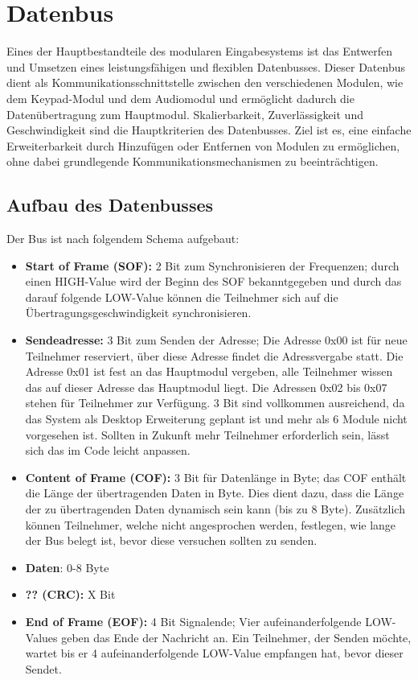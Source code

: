 \section{Datenbus}
Eines der Hauptbestandteile des modularen Eingabesystems ist das Entwerfen und Umsetzen eines leistungsfähigen und flexiblen Datenbusses. Dieser Datenbus dient als Kommunikationsschnittstelle zwischen den verschiedenen Modulen, wie dem Keypad-Modul und dem Audiomodul und ermöglicht dadurch die Datenübertragung zum Hauptmodul. Skalierbarkeit, Zuverlässigkeit und Geschwindigkeit sind die Hauptkriterien des Datenbusses. Ziel ist es, eine einfache Erweiterbarkeit durch Hinzufügen oder Entfernen von Modulen zu ermöglichen, ohne dabei grundlegende Kommunikationsmechanismen zu beeinträchtigen.

\subsection{Aufbau des Datenbusses}
Der Bus ist nach folgendem Schema aufgebaut:
\begin{itemize}
	\item \textbf{Start of Frame (SOF):} 2 Bit zum Synchronisieren der Frequenzen; durch einen HIGH-Value wird der Beginn des SOF bekanntgegeben und durch das darauf folgende LOW-Value können die Teilnehmer sich auf die Übertragungsgeschwindigkeit synchronisieren.
	\item \textbf{Sendeadresse:} 3 Bit zum Senden der Adresse; Die Adresse 0x00 ist für neue Teilnehmer reserviert, über diese Adresse findet die Adressvergabe statt. Die Adresse 0x01 ist fest an das Hauptmodul vergeben, alle Teilnehmer wissen das auf dieser Adresse das Hauptmodul liegt. Die Adressen 0x02 bis 0x07 stehen für Teilnehmer zur Verfügung. 3 Bit sind vollkommen ausreichend, da das System als Desktop Erweiterung geplant ist und mehr als 6 Module nicht vorgesehen ist. Sollten in Zukunft mehr Teilnehmer erforderlich sein, lässt sich das im Code leicht anpassen.
	\item \textbf{Content of Frame (COF):} 3 Bit für Datenlänge in Byte; das COF enthält die Länge der übertragenden Daten in Byte. Dies dient dazu, dass die Länge der zu übertragenden Daten dynamisch sein kann (bis zu 8 Byte). Zusätzlich können Teilnehmer, welche nicht angesprochen werden, festlegen, wie lange der Bus belegt ist, bevor diese versuchen sollten zu senden.
	\item \textbf{Daten}: 0-8 Byte
	\item \textbf{?? (CRC):} X Bit
	\item \textbf{End of Frame (EOF):} 4 Bit Signalende; Vier aufeinanderfolgende LOW-Values geben das Ende der Nachricht an. Ein Teilnehmer, der Senden möchte, wartet bis er 4 aufeinanderfolgende LOW-Value empfangen hat, bevor dieser Sendet.
\end{itemize}

